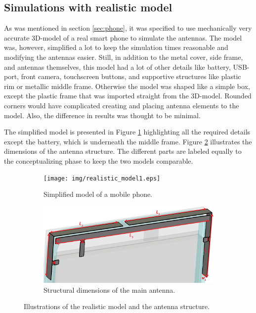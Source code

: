 \subsection{Simulations with realistic model}
\label{sec:sim_realistic}
As was mentioned in section \ref{sec:phone}, it was specified to use mechanically very accurate 3D-model of a real smart phone to simulate the antennas. The model was, however, simplified a lot to keep the simulation times reasonable and modifying the antennas easier. Still, in addition to the metal cover, side frame, and antennas themselves, this model had a lot of other details like battery, USB-port, front camera, touchscreen buttons, and supportive structures like plastic rim or metallic middle frame. Otherwise the model was shaped like a simple box, except the plastic frame that was imported straight from the 3D-model. Rounded corners would have complicated creating and placing antenna elements to the model. Also, the difference in results was thought to be minimal. 

The simplified model is presented in Figure \ref{fig:realistic_model1} highlighting all the required details except the battery, which is underneath the middle frame. Figure \ref{fig:realistic_model2} illustrates the dimensions of the antenna structure. The different parts are labeled equally to the conceptualizing phase to keep the two models comparable.
\begin{figure}[H]
    \centering
    \begin{subfigure}[b]{0.5\textwidth}
        \texttt{[image: img/realistic\_model1.eps]}
        \caption{Simplified model of a mobile phone.}
        \label{fig:realistic_model1}
    \end{subfigure}
    
    \begin{subfigure}[b]{0.5\textwidth}
        \includegraphics[width=\textwidth]{img/realistic_model2.eps}
        \caption{Structural dimensions of the main antenna.}
        \label{fig:realistic_model2}
    \end{subfigure}
    \caption{Illustrations of the realistic model and the antenna structure.}
    \label{fig:realistic_model}
\end{figure}

